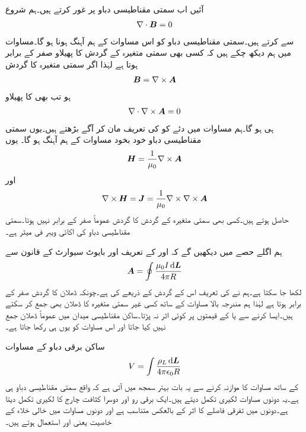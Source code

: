 آئیں اب سمتی مقناطیسی دباو پر غور کرتے ہیں۔ہم شروع
\begin{align}\label{مساوات_مقناطیسی_پھیلاو_بہاو_صفر_ہے}
\nabla \cdot {\ensuremath{{\boldsymbol{B}}}}=0
\end{align}
سے کرتے ہیں۔سمتی مقناطیسی دباو کو اس مساوات کے ہم آہنگ ہونا ہو گا۔مساوات  میں ہم دیکھ چکے ہیں کہ کسی بھی سمتی متغیرہ کے گردش کا پھیلاو صفر کے برابر ہوتا ہے لہٰذا اگر  سمتی متغیرہ  کا گردش
\begin{align}\label{مساوات_مقناطیسی_سمتی_دباو_تعریف}
{\ensuremath{{\boldsymbol{B}}}}=\nabla \times {\ensuremath{{\boldsymbol{A}}}}
\end{align}
 ہو تب بھی  کا پھیلاو
\begin{align*}
\nabla \cdot \nabla \times {\ensuremath{{\boldsymbol{A}}}}=0
\end{align*}
ہی ہو گا۔ہم مساوات  میں دئے  کو  کی تعریف مان کر آگے بڑھتے ہیں۔یوں سمتی مقناطیسی دباو خود بخود مساوات  کے ہم آہنگ ہو گا۔  یوں
\begin{align*}
{\ensuremath{{\boldsymbol{H}}}}=\frac{1}{\mu_0} \nabla \times {\ensuremath{{\boldsymbol{A}}}}
\end{align*}
اور
\begin{align*}
\nabla \times {\ensuremath{{\boldsymbol{H}}}}={{\boldsymbol{J}}}=\frac{1}{\mu_0} \nabla \times \nabla \times {\ensuremath{{\boldsymbol{A}}}}
\end{align*}
حاصل ہوتے ہیں۔کسی بھی سمتی متغیرہ کے گردش کا گردش عموماً صفر کے برابر نہیں ہوتا۔سمتی مقناطیسی دباو  کی اکائی ویبر فی میٹر  ہے۔ 

ہم اگلے حصے میں دیکھیں گے کہ  اور  کے تعریف اور بایوٹ سیوارٹ کے قانون سے
\begin{align}\label{مساوات_مقناطیسی_سمتی_دباو}
\kvec{A}=\oint \frac{\mu_0 I \dif \kvec{L}}{4\pi R}
\end{align}
لکھا جا سکتا ہے۔ہم نے  کی تعریف اس کے گردش کے ذریعے کی ہے۔چونکہ ڈھلان کا گردش صفر کے برابر ہوتا ہے  لہٰذا ہم مندرجہ بالا مساوات کے ساتھ کسی غیر سمتی متغیرہ کا ڈھلان بھی جمع کر سکتے ہیں۔ایسا کرنے سے  یا  کے قیمتوں پر کوئی اثر نہ پڑتا۔ساکن مقناطیسی میدان میں عموماً ڈھلان جمع نہیں کیا جاتا اور اس مساوات کو یوں ہی رکھا جاتا ہے۔

ساکن برقی دباو کے مساوات
\begin{align*}
V=\int \frac{\rho_L \dif \kvec{L}}{4\pi \epsilon_0 R}
\end{align*}
کے ساتھ مساوات کا موازنہ کرنے سے یہ بات بہتر سمجھ میں آتی ہے کہ  واقع سمتی مقناطیسی دباو ہی ہے۔یہ دونوں مساوات لکیری تکمل دیتے ہیں۔ایک برقی رو اور دوسرا کثافت چارج کا لکیری تکمل دیتا ہے۔دونوں میں تفرقی فاصلے  کا اثر  کے بالعکس متناسب ہے اور دونوں مساوات میں خالی خلاء کے خاصیت یعنی  اور  استعمال ہوتے ہیں۔

